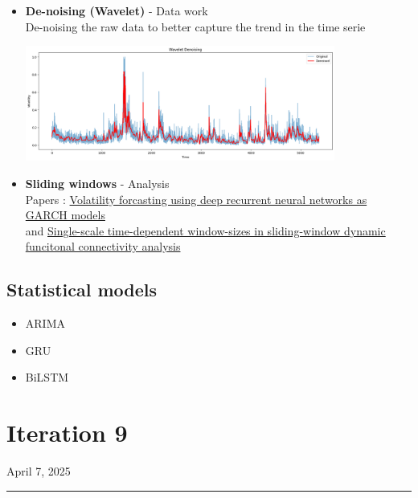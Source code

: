 \documentclass[letterpaper,11pt]{article}
\begin{document}
\begin{itemize}
  \item \textbf{De-noising (Wavelet)} - Data work\\
  De-noising the raw data to better capture the trend in the time serie
  \begin{center}
    \includegraphics[width=0.8\textwidth]{img/wavelet.png}
    \end{center}
  \item \textbf{Sliding windows} - Analysis\\
  Papers : \href{https://link.springer.com/content/pdf/10.1007/s00180-023-01349-1.pdf}{Volatility forcasting using deep recurrent neural networks as GARCH models}\\
  and \href{https://www.sciencedirect.com/science/article/pii/S1053811920305978}{Single-scale time-dependent window-sizes in sliding-window dynamic funcitonal connectivity analysis}
  
\end{itemize}


\subsection*{Statistical models}
\begin{itemize}
  \item ARIMA
  \item GRU
  \item BiLSTM
\end{itemize}







\newpage
\section*{Iteration 9}
\begin{flushright}
April 7, 2025
\end{flushright}
\hrule
\vspace{0.2in}

\end{document}
